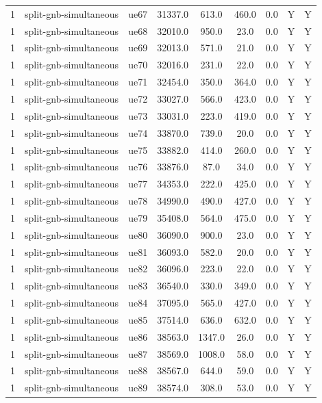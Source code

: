 \begin{table}[ht]
\begin{tabular}{|c|c|c|c|c|c|c|c|c|}
1 & split-gnb-simultaneous & ue67 & 31337.0 & 613.0 & 460.0 & 0.0 & Y & Y \\
1 & split-gnb-simultaneous & ue68 & 32010.0 & 950.0 & 23.0 & 0.0 & Y & Y \\
1 & split-gnb-simultaneous & ue69 & 32013.0 & 571.0 & 21.0 & 0.0 & Y & Y \\
1 & split-gnb-simultaneous & ue70 & 32016.0 & 231.0 & 22.0 & 0.0 & Y & Y \\
1 & split-gnb-simultaneous & ue71 & 32454.0 & 350.0 & 364.0 & 0.0 & Y & Y \\
1 & split-gnb-simultaneous & ue72 & 33027.0 & 566.0 & 423.0 & 0.0 & Y & Y \\
1 & split-gnb-simultaneous & ue73 & 33031.0 & 223.0 & 419.0 & 0.0 & Y & Y \\
1 & split-gnb-simultaneous & ue74 & 33870.0 & 739.0 & 20.0 & 0.0 & Y & Y \\
1 & split-gnb-simultaneous & ue75 & 33882.0 & 414.0 & 260.0 & 0.0 & Y & Y \\
1 & split-gnb-simultaneous & ue76 & 33876.0 & 87.0 & 34.0 & 0.0 & Y & Y \\
1 & split-gnb-simultaneous & ue77 & 34353.0 & 222.0 & 425.0 & 0.0 & Y & Y \\
1 & split-gnb-simultaneous & ue78 & 34990.0 & 490.0 & 427.0 & 0.0 & Y & Y \\
1 & split-gnb-simultaneous & ue79 & 35408.0 & 564.0 & 475.0 & 0.0 & Y & Y \\
1 & split-gnb-simultaneous & ue80 & 36090.0 & 900.0 & 23.0 & 0.0 & Y & Y \\
1 & split-gnb-simultaneous & ue81 & 36093.0 & 582.0 & 20.0 & 0.0 & Y & Y \\
1 & split-gnb-simultaneous & ue82 & 36096.0 & 223.0 & 22.0 & 0.0 & Y & Y \\
1 & split-gnb-simultaneous & ue83 & 36540.0 & 330.0 & 349.0 & 0.0 & Y & Y \\
1 & split-gnb-simultaneous & ue84 & 37095.0 & 565.0 & 427.0 & 0.0 & Y & Y \\
1 & split-gnb-simultaneous & ue85 & 37514.0 & 636.0 & 632.0 & 0.0 & Y & Y \\
1 & split-gnb-simultaneous & ue86 & 38563.0 & 1347.0 & 26.0 & 0.0 & Y & Y \\
1 & split-gnb-simultaneous & ue87 & 38569.0 & 1008.0 & 58.0 & 0.0 & Y & Y \\
1 & split-gnb-simultaneous & ue88 & 38567.0 & 644.0 & 59.0 & 0.0 & Y & Y \\
1 & split-gnb-simultaneous & ue89 & 38574.0 & 308.0 & 53.0 & 0.0 & Y & Y \\

\end{tabular}
\end{table}
